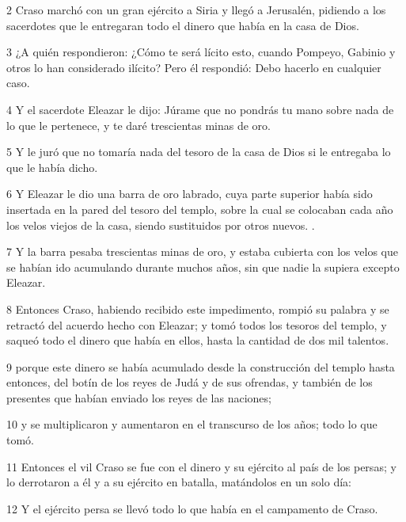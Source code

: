 \par 2 Craso marchó con un gran ejército a Siria y llegó a Jerusalén, pidiendo a los sacerdotes que le entregaran todo el dinero que había en la casa de Dios.

\par 3 ¿A quién respondieron: ¿Cómo te será lícito esto, cuando Pompeyo, Gabinio y otros lo han considerado ilícito? Pero él respondió: Debo hacerlo en cualquier caso.

\par 4 Y el sacerdote Eleazar le dijo: Júrame que no pondrás tu mano sobre nada de lo que le pertenece, y te daré trescientas minas de oro.

\par 5 Y le juró que no tomaría nada del tesoro de la casa de Dios si le entregaba lo que le había dicho.

\par 6 Y Eleazar le dio una barra de oro labrado, cuya parte superior había sido insertada en la pared del tesoro del templo, sobre la cual se colocaban cada año los velos viejos de la casa, siendo sustituidos por otros nuevos. .

\par 7 Y la barra pesaba trescientas minas de oro, y estaba cubierta con los velos que se habían ido acumulando durante muchos años, sin que nadie la supiera excepto Eleazar.

\par 8 Entonces Craso, habiendo recibido este impedimento, rompió su palabra y se retractó del acuerdo hecho con Eleazar; y tomó todos los tesoros del templo, y saqueó todo el dinero que había en ellos, hasta la cantidad de dos mil talentos.

\par 9 porque este dinero se había acumulado desde la construcción del templo hasta entonces, del botín de los reyes de Judá y de sus ofrendas, y también de los presentes que habían enviado los reyes de las naciones;

\par 10 y se multiplicaron y aumentaron en el transcurso de los años; todo lo que tomó.

\par 11 Entonces el vil Craso se fue con el dinero y su ejército al país de los persas; y lo derrotaron a él y a su ejército en batalla, matándolos en un solo día:

\par 12 Y el ejército persa se llevó todo lo que había en el campamento de Craso.

